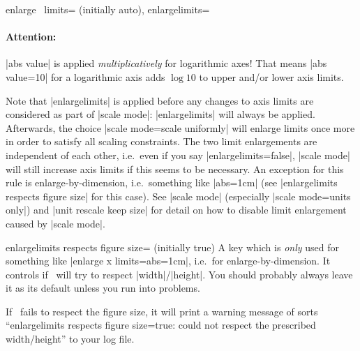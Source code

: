 \begin{pgfplotsxykeylist}{%
	enlarge \x\ limits= (initially auto),
	enlargelimits=}
	\paragraph{Attention:} |abs value| is applied \emph{multiplicatively} for logarithmic axes! That means |abs value=10| for a logarithmic axis adds $\log 10$ to upper and/or lower axis limits.
\begin{codeexample}[]
\end{codeexample}


	Note that |enlargelimits| is applied before any changes to axis limits are considered as part of |scale mode|: |enlargelimits| will always be applied. Afterwards, the choice |scale mode=scale uniformly| will enlarge limits once more in order to satisfy all scaling constraints. The two limit enlargements are independent of each other, i.e.\ even if you say |enlargelimits=false|, |scale mode| will still increase axis limits if this seems to be necessary. An exception for this rule is enlarge-by-dimension, i.e.\ something like |abs=1cm| (see |enlargelimits respects figure size| for this case).
	See |scale mode| (especially |scale mode=units only|) and |unit rescale keep size| for detail on how to disable limit enlargement caused by |scale mode|. 
\end{pgfplotsxykeylist}

\begin{pgfplotskey}{enlargelimits respects figure size= (initially true)}
	A key which is \emph{only} used for something like |enlarge x limits={abs=1cm}|, i.e.\ for enlarge-by-dimension. It controls if \PGFPlots\ will try to respect |width|/|height|. You should probably always leave it as its default unless you run into problems.

	If \PGFPlots\ fails to respect the figure size, it will print a warning message of sorts ``enlargelimits respects figure size=true: could not respect the prescribed width/height'' to your log file. 
	
\end{pgfplotskey}

